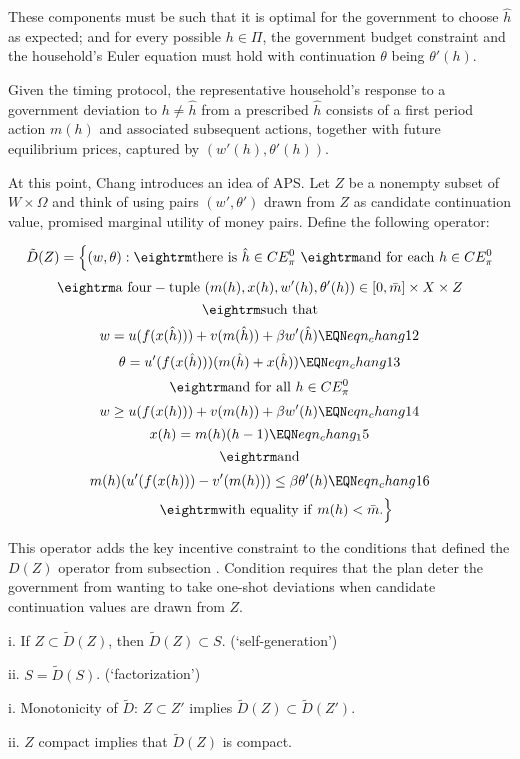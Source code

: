 \medskip
These components must be such that it is optimal for the government to choose $\hat h$ as expected; and for every possible $h \in \Pi$, the government budget constraint and
the household's Euler equation must hold with continuation $\theta $ being $\theta'(h)$.

Given the timing protocol,  the representative household's response to a government deviation to $h \neq \hat h$ from a prescribed  $\hat h$  consists of a first period action $m(h)$ and associated
subsequent actions, together with future equilibrium prices, captured by $(w'(h), \theta'(h))$.

 At this point, Chang introduces an idea of APS.  Let $Z $ be a nonempty subset of $W \times \Omega$ and think
of using pairs $(w', \theta')$ drawn from $Z$ as candidate continuation value, promised marginal utility of money  pairs.  Define
the following  operator: %

$$ \tilde D(Z) = \Bigl\{ (w,\theta): {\rm there \ is } \ \hat h \in CE_\pi^0 \ {\rm and \ for \ each } \ h \in CE_\pi^0 $$
$$ {\rm a \ four-tuple } \ (m(h), x(h), w'(h), \theta'(h)) \in [0,\bar m]\times X \times Z  $$
$$ {\rm such \ that}$$
$$ w = u(f(x(\hat h)))+ v(m(\hat h)) + \beta w'(\hat h) \EQN eqn_chang12 $$
$$ \theta = u'(f(x(\hat h))) ( m(\hat h) + x(\hat h)) \EQN eqn_chang13 $$
$$ {\rm and \ for \ all} \ h \in CE_\pi^0 $$
$$ w \geq u(f(x(h))) + v(m(h)) + \beta w'(h) \EQN eqn_chang14 $$
$$ x(h) = m(h) (h-1) \EQN eqn_chang_15 $$
$$ {\rm and}$$
$$ m(h) (u'(f(x(h))) - v'(m(h))) \leq \beta \theta'(h)   \EQN eqn_chang16 $$
$$ \quad \quad \ {\rm with \ equality \ if } \ m(h) < \bar m .  \Bigr\}   $$


This operator adds the key incentive constraint  to the conditions that  defined the
$D(Z)$ operator from subsection . Condition  requires that  the plan  deter  the government from wanting to
take one-shot deviations when candidate continuation values are drawn from $Z$.
\medskip
{}
\item{i.} If $Z \subset \tilde D(Z)$, then $\tilde D(Z) \subset S$.  (`self-generation')
\item{ii.} $S = \tilde D(S)$. (`factorization')

\medskip
{}
\item{i.} Monotonicity of $\tilde D$: $Z \subset Z'$ implies $\tilde D(Z) \subset \tilde D(Z')$.
\item{ii.} $Z$ compact implies that $\tilde D(Z)$ is compact.

